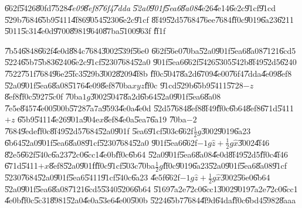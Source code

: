 \clearpage%

\begin{case}
\U{662f}\U{5426}\U{80fd}\U{7528}\emph{\U{4e09}\U{8ef8}\U{76f4}\U{7dda}%
\U{52a0}\U{901f}\U{5ea6}\U{8a08}}\U{4e26}\U{4e14}\U{6e2c}\U{91cf}\U{91cd}%
\U{529b}\U{7684}\U{65b9}\U{5411}\U{4f86}\U{9054}\U{5230}\U{6e2c}\U{91cf}%
\U{8f49}\U{52d5}\U{7684}\U{76ee}\U{7684}\U{ff0c}\U{9019}\U{6a23}\U{6211}%
\U{5011}\U{5c31}\U{4e0d}\U{9700}\U{8981}\U{9640}\U{87ba}\U{5100}\U{963f}%
\U{ff1f}
\end{case}

\U{7b54}\U{6848}\U{662f}\U{4e0d}\U{884c}\U{7684}\U{3002}\U{539f}\U{56e0}%
\U{662f}\U{56e0}\U{70ba}\U{52a0}\U{901f}\U{5ea6}\U{8a08}\U{7121}\U{6cd5}%
\U{5224}\U{65b7}\U{5b83}\U{6240}\U{6e2c}\U{91cf}\U{5230}\U{7684}\U{52a0}%
\U{901f}\U{5ea6}\U{662f}\U{5426}\U{5305}\U{542b}\U{8f49}\U{52d5}\U{6240}%
\U{7522}\U{751f}\U{7684}\U{96e2}\U{5fc3}\U{529b}\U{3002}\U{8209}\U{4f8b}%
\U{ff0c}\U{5047}\U{8a2d}\U{6709}\U{4e00}\U{76f4}\U{7dda}\U{4e09}\U{8ef8}%
\U{52a0}\U{901f}\U{5ea6}\U{8a08}\U{5176}\U{4e09}\U{8ef8}\U{70ba}$xyz$\U{ff0c}%
\U{91cd}\U{529b}\U{65b9}\U{5411}\U{5728}$-z$\U{8ef8}\U{ff0c}\U{5927}\U{5c0f}%
\U{70ba}$1g$\U{3002}\U{5047}\U{8a2d}\U{6b64}\U{52a0}\U{901f}\U{5ea6}\U{8a08}%
\U{7e5e}\U{8457}\U{4e00}\U{500b}\U{5728}\U{7a7a}\U{9593}\U{4e0a}\U{4e0d}%
\U{52d5}\U{7684}\U{8ef8}\U{8f49}\U{ff0c}\U{6b64}\U{8ef8}\U{671d}\U{5411}$+z$%
\U{65b9}\U{5411}\U{4e26}\U{901a}\U{904e}$x$\U{8ef8}\U{4e0a}\U{5ea7}\U{6a19}%
\U{70ba}$-2$\U{7684}\U{9ede}\U{ff0c}\U{8f49}\U{52d5}\U{7684}\U{52a0}\U{901f}%
\U{5ea6}\U{91cf}\U{503c}\U{662f}$\frac{1}{2}g$\U{3002}\U{9019}\U{6a23}%
\U{6b64}\U{52a0}\U{901f}\U{5ea6}\U{8a08}\U{91cf}\U{5230}\U{7684}\U{52a0}%
\U{901f}\U{5ea6}\U{662f}$-1g\hat{z}+\frac{1}{2}g\hat{x}$\U{3002}\U{4f46}%
\U{82e5}\U{662f}\U{540c}\U{6a23}\U{72c0}\U{6cc1}\U{4e0b}\U{ff0c}\U{6b64}%
\U{52a0}\U{901f}\U{5ea6}\U{8a08}\U{4e0d}\U{8f49}\U{52d5}\U{ff0c}\U{4f46}%
\U{671d}\U{5411}$+x$\U{8ef8}\U{52a0}\U{901f}\U{ff0c}\U{91cf}\U{503c}\U{70ba}$%
\frac{1}{2}g$\U{ff0c}\U{9019}\U{6a23}\U{52a0}\U{901f}\U{5ea6}\U{8a08}\U{91cf}%
\U{5230}\U{7684}\U{52a0}\U{901f}\U{5ea6}\U{5411}\U{91cf}\U{540c}\U{6a23}%
\U{4e5f}\U{662f}$-1g\hat{z}+\frac{1}{2}g\hat{x}$\U{3002}\U{56e0}\U{6b64}%
\U{52a0}\U{901f}\U{5ea6}\U{8a08}\U{7121}\U{6cd5}\U{5340}\U{5206}\U{6b64}%
\U{5169}\U{7a2e}\U{72c0}\U{6cc1}\U{3002}\U{9019}\U{7a2e}\U{72c0}\U{6cc1}%
\U{4e0b}\U{ff0c}\U{5c31}\U{8981}\U{52a0}\U{4e0a}\U{53e6}\U{4e00}\U{500b}%
\U{5224}\U{65b7}\U{7684}\U{4f9d}\U{64da}\U{ff0c}\U{6bd4}\U{5982}\U{8aaa}%
